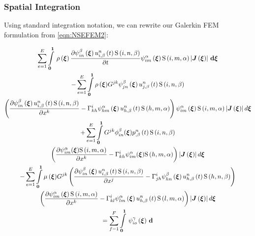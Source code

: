 \subsubsection{Spatial Integration}

Using standard integration notation, we can rewrite our Galerkin FEM
formulation from \ref{eqn:NSEFEM2}:

\begin{multline}
  \dsum_{e=1}^{E}\gint{\vectr{0}}{\vectr{1}}{\fnof{\rho}{\vectr{\xi}}\delby{\idxgbfn{i}{n}{\beta}{\vectr{\xi}}
      \fnof{\idxnodedof{u}{i}{n}{\beta}}{t}\idxgsf{i}{n}{\beta}}{t}
    \idxgbfn{i}{m}{\alpha}{\vectr{\xi}}\idxgsf{i}{m}{\alpha}
    \abs{\fnof{\matr{J}}{\vectr{\xi}}}}{\vectr{\xi}}\\
  - \dsum_{e=1}^{E}\dintl{\vectr{0}}{\vectr{1}}{\fnof{\rho}{\vectr{\xi}}}G^{jk}\idxgbfn{j}{n}{\beta}{\vectr{\xi}}
  \fnof{\idxnodedof{u}{j}{n}{\beta}}{t}\idxgsf{i}{n}{\beta}\\
  \pbrac{\delby{\idxgbfn{i}{n}{\beta}{\vectr{\xi}}\fnof{\idxnodedof{u}{i}{n}{\beta}}{t}
      \idxgsf{i}{n}{\beta}}{x^{k}}-\christoffel{i}{k}{h}\idxgbfn{h}{m}{\alpha}{\vectr{\xi}}
    \fnof{\idxnodedof{u}{h}{n}{\beta}}{t}\idxgsf{h}{m}{\alpha}}
  \idxgbfn{i}{m}{\alpha}{\vectr{\xi}}\idxgsf{i}{m}{\alpha}
  \abs{\fnof{\matr{J}}{\vectr{\xi}}}d\vectr{\xi}\\
  +\dsum_{e=1}^{E}\dintl{\vectr{0}}{\vectr{1}}G^{jk}\phi_{in}^{\beta}({\vectr{\xi}})
  \fnof{\idxnodedof{p}{}{n}{\beta}}{t}\idxgsf{i}{n}{\beta}\\
  \pbrac{\delby{\psi_{im}^{\alpha}({\vectr{\xi}})\idxgsf{i}{m}{\alpha}}{x^{k}}-
  \christoffel{i}{k}{h}\psi_{im}^{\alpha}({\vectr{\xi}})\idxgsf{h}{m}{\alpha}
    }\abs{\fnof{\matr{J}}{\vectr{\xi}}}d\vectr{\xi}\\
  -\dsum_{e=1}^{E}\dintl{\vectr{0}}{\vectr{1}}{\fnof{\mu}{\vectr{\xi}}}G^{jk}\pbrac{\delby{\idxgbfn{i}{n}{\beta}{\vectr{\xi}}
     \fnof{\idxnodedof{u}{i}{n}{\beta}}{t}\idxgsf{i}{n}{\beta}}{x^{j}}-
      \christoffel{i}{j}{h}\idxgbfn{h}{n}{\beta}{\vectr{\xi}}
      \fnof{\idxnodedof{u}{h}{n}{\beta}}{t}\idxgsf{h}{n}{\beta}} \\
    \pbrac{\delby{\idxgbfn{i}{m}{\alpha}{\vectr{\xi}}\idxgsf{i}{m}{\alpha}}{x^{k}}-
      \christoffel{i}{k}{l}\idxgbfn{l}{m}{\alpha}{\vectr{\xi}}
      \fnof{\idxnodedof{u}{h}{n}{\beta}}{t}
      \idxgsf{l}{m}{\alpha}}\abs{\fnof{\matr{J}}{\vectr{\xi}}}d\vectr{\xi}\\
  =\dsum_{f=1}^{F}\gint{\vectr{0}}{\vectr{1}}{\idxgbfn{i}{o}{\gamma}{\vectr{\xi}}
}
\end{multline}
